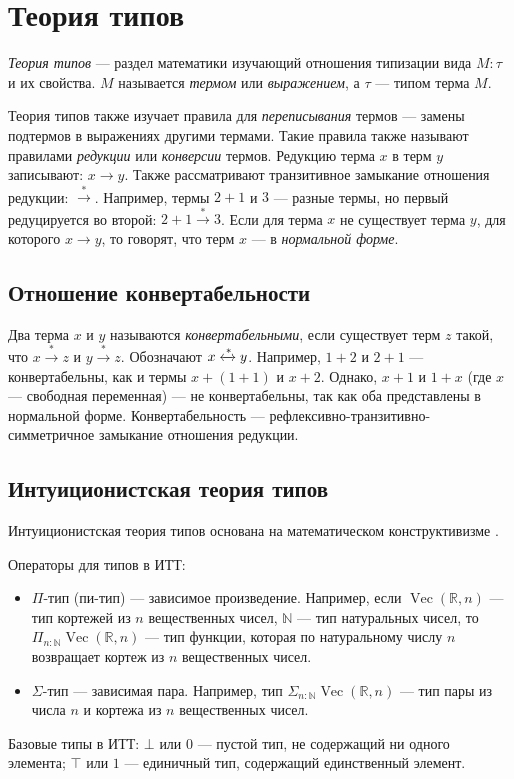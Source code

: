 \section{Теория типов}

\emph{Теория типов} — раздел математики изучающий отношения типизации вида
$ M : \tau $ и их свойства. $M$ называется \emph{термом} или \emph{выражением},
а $\tau$ — типом терма $M$.

Теория типов также изучает правила для \emph{переписывания} термов — замены
подтермов в выражениях другими термами.
Такие правила также называют правилами \emph{редукции} или \emph{конверсии} термов.
Редукцию терма $x$ в терм $y$ записывают: $x \to y$.
Также рассматривают транзитивное замыкание отношения редукции: $ \xrightarrow{*} $.
Например, термы $2 + 1$ и $3$ — разные термы, но первый редуцируется во второй:
$2 + 1 \xrightarrow{*} 3$.
Если для терма $x$ не существует терма $y$, для которого $x \to y$,
то говорят, что терм $x$ — в \emph{нормальной форме}.

\subsection{Отношение конвертабельности}

Два терма $x$ и $y$ называются \emph{конвертабельными},
если существует терм $z$ такой, что $x \xrightarrow{*} z$ и $y \xrightarrow{*} z$. Обозначают  $x \xleftrightarrow{*} y$.
Например, $1+2$ и $2+1$ — конвертабельны, как и термы
$x + (1 + 1)$ и $x + 2$. Однако, $x+1$ и $1+x$ (где $x$ — свободная переменная)
— не конвертабельны, так как оба представлены в нормальной форме.
Конвертабельность — рефлексивно-транзитивно-симметричное замыкание отношения
редукции.

\subsection{Интуиционистская теория типов}

Интуиционистская теория типов основана на математическом конструктивизме \cite{MLTT}.

Операторы для типов в ИТТ:
\begin{itemize}
    \item $\Pi$-тип (пи-тип) — зависимое произведение.
        Например, если $\operatorname{Vec}({\mathbb R}, n)$ — тип кортежей из $n$ вещественных чисел,
        $\mathbb N$ — тип натуральных чисел, то
        $\Pi_{n \mathbin{:} {\mathbb N}} \operatorname{Vec}({\mathbb R}, n)$ 
        — тип функции, которая по натуральному числу $n$ возвращает кортеж из
        $n$ вещественных чисел.
    \item $\Sigma$-тип — зависимая пара.
        Например, тип $\Sigma_{n \mathbin{:} {\mathbb N}} \operatorname{Vec}({\mathbb R}, n)$ — тип 
        пары из числа $n$ и кортежа из $n$ вещественных чисел.
\end{itemize}
Базовые типы в ИТТ:
$\bot$ или $0$ — пустой тип, не содержащий ни одного элемента;
$\top$ или $1$ — единичный тип, содержащий единственный элемент.

